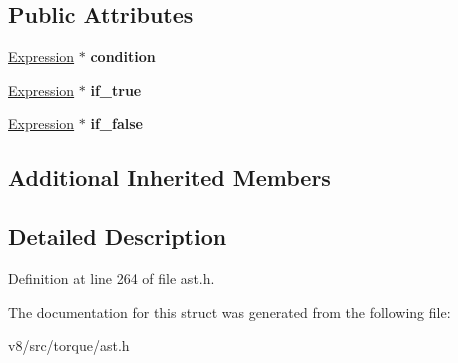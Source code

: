 \subsection*{Public Attributes}
\begin{DoxyCompactItemize}
\item 
\mbox{\label{structv8_1_1internal_1_1torque_1_1ConditionalExpression_a19e18dea87c91a0dfd4101d5c2dd2dd5}} 
\mbox{\hyperlink{structv8_1_1internal_1_1torque_1_1Expression}{Expression}} $\ast$ {\bfseries condition}
\item 
\mbox{\label{structv8_1_1internal_1_1torque_1_1ConditionalExpression_aac7187a861f56304812bac6e9dbe30e7}} 
\mbox{\hyperlink{structv8_1_1internal_1_1torque_1_1Expression}{Expression}} $\ast$ {\bfseries if\+\_\+true}
\item 
\mbox{\label{structv8_1_1internal_1_1torque_1_1ConditionalExpression_a3c25ff12ea834a49d2aabe027b2c3622}} 
\mbox{\hyperlink{structv8_1_1internal_1_1torque_1_1Expression}{Expression}} $\ast$ {\bfseries if\+\_\+false}
\end{DoxyCompactItemize}
\subsection*{Additional Inherited Members}


\subsection{Detailed Description}


Definition at line 264 of file ast.\+h.



The documentation for this struct was generated from the following file\+:\begin{DoxyCompactItemize}
\item 
v8/src/torque/ast.\+h\end{DoxyCompactItemize}
